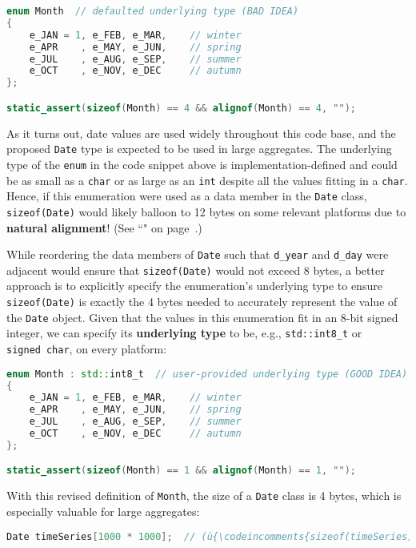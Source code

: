 \begin{lstlisting}[language=C++]
enum Month  // defaulted underlying type (BAD IDEA)
{
    e_JAN = 1, e_FEB, e_MAR,    // winter
    e_APR    , e_MAY, e_JUN,    // spring
    e_JUL    , e_AUG, e_SEP,    // summer
    e_OCT    , e_NOV, e_DEC     // autumn
};

static_assert(sizeof(Month) == 4 && alignof(Month) == 4, "");
\end{lstlisting}

\noindent As it turns out, date values are used widely throughout this code base,
and the proposed \texttt{Date} type is expected to be used in large
aggregates. The underlying type of the \texttt{enum} in the code snippet
above is implementation-defined and could be as small as a \texttt{char}
or as large as an \texttt{int} despite all the values fitting in a
\texttt{char}. Hence, if this enumeration were used as a data member in
the \texttt{Date} class, \texttt{sizeof(Date)} would likely balloon to
12 bytes on some relevant platforms due to \textbf{natural alignment}!
(See ``" on page~\pageref{alignas}.)

While reordering the data members of \texttt{Date} such that \texttt{d\_year} and
\texttt{d\_day} were adjacent would ensure that \texttt{sizeof(Date)}
would not exceed 8 bytes, a better approach is to explicitly specify the
enumeration's underlying type to ensure \texttt{sizeof(Date)} is exactly
the 4 bytes needed to accurately represent the value of the
\texttt{Date} object. Given that the values in this enumeration fit in
an 8-bit signed integer, we can specify its \textbf{underlying type} to
be, e.g., \texttt{std::int8\_t} or \texttt{signed}~\texttt{char}, on
every platform:

\begin{lstlisting}[language=C++]
enum Month : std::int8_t  // user-provided underlying type (GOOD IDEA)
{
    e_JAN = 1, e_FEB, e_MAR,    // winter
    e_APR    , e_MAY, e_JUN,    // spring
    e_JUL    , e_AUG, e_SEP,    // summer
    e_OCT    , e_NOV, e_DEC     // autumn
};

static_assert(sizeof(Month) == 1 && alignof(Month) == 1, "");
\end{lstlisting}

\noindent With this revised definition of \texttt{Month}, the size of a
\texttt{Date} class is 4 bytes, which is especially valuable for large
aggregates:

\begin{lstlisting}[language=C++]
Date timeSeries[1000 * 1000];  // (ù{\codeincomments{sizeof(timeSeries)}}ù) is now 4Mb (not 12Mb)
\end{lstlisting}


